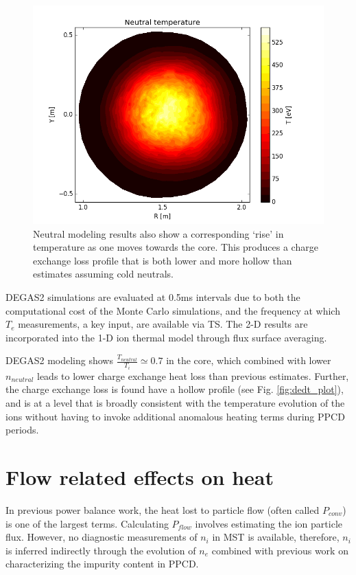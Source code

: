 \documentclass[aip, pop, preprint]{revtex4-1}
\begin{document}
\begin{figure}
	\centering
	\includegraphics[width = 1.\linewidth]{./plots/degas_neutral_t}
	\caption{Neutral modeling results also show a corresponding `rise' in temperature as one moves towards the core. This produces a charge exchange loss profile that is both lower and more hollow than estimates assuming cold neutrals.}\label{fig:temp}
\end{figure}

DEGAS2 simulations are evaluated at 0.5ms intervals due to both the
computational cost of the Monte Carlo simulations, and the frequency at which $
T_e $ measurements, a key input, are available via TS. The 2-D results are
incorporated into the 1-D ion thermal model through flux surface averaging.

DEGAS2 modeling shows $\frac{T_{neutral}}{T_{i}} \simeq 0.7$ in the core, which combined with lower $ n_{neutral} $ leads to
lower charge exchange heat loss than previous estimates. Further, the charge
exchange loss is found have a hollow profile (see Fig. \ref{fig:dedt_plot}), and is at a level that is broadly
consistent with the temperature evolution of the ions without having to invoke
additional anomalous heating terms during PPCD periods. 

\section{Flow related effects on heat}\label{sec:flow}

In previous power balance work, the heat lost to particle flow (often called $P_{conv}$) is one of the largest terms\cite{Fiksel2006}. Calculating $P_{flow}$ involves estimating the ion
particle flux.  However, no diagnostic measurements of $n_i$ in MST is
available, therefore, $n_i$ is inferred indirectly through the evolution of
$n_e$ combined with previous work on characterizing the impurity content in
PPCD\cite{Kumar2012,Nornberg2018IncorporatingCharge}.
\end{document}
